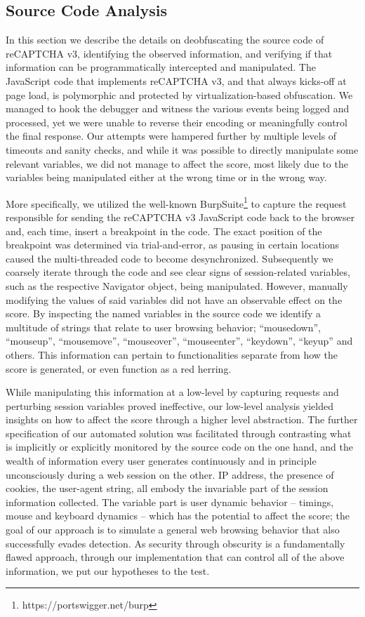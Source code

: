 \subsection{Source Code Analysis}
In this section we describe the details on deobfuscating the source code of reCAPTCHA v3, identifying the observed information, and verifying if that information can be programmatically intercepted and manipulated.
The JavaScript code that implements reCAPTCHA v3, and that always kicks-off at page load, is polymorphic and protected by virtualization-based obfuscation.
We managed to hook the debugger and witness the various events being logged and processed, yet we were unable to reverse their encoding or meaningfully control the final response.
Our attempts were hampered further by multiple levels of timeouts and sanity checks, and while it was possible to directly manipulate some relevant variables, we did not manage to affect the score, most likely due to the variables being manipulated either at the wrong time or in the wrong way. 

More specifically, we utilized the well-known BurpSuite\footnote{https://portswigger.net/burp} to capture the request responsible for sending the reCAPTCHA v3 JavaScript code back to the browser and, each time, insert a breakpoint in the code.
The exact position of the breakpoint was determined via trial-and-error, as pausing in certain locations caused the multi-threaded code to become desynchronized.
Subsequently we coarsely iterate through the code and see clear signs of session-related variables, such as the respective Navigator object, being manipulated.
However, manually modifying the values of said variables did not have an observable effect on the score. 
By inspecting the named variables in the source code we identify a multitude of strings that relate to user browsing behavior; ``mousedown'', ``mouseup'', ``mousemove'', ``mouseover'', ``mouseenter'', ``keydown'', ``keyup'' and others.
This information can pertain to functionalities separate from how the score is generated, or even function as a red herring.

While manipulating this information at a low-level by capturing requests and perturbing session variables proved ineffective, our low-level analysis yielded insights on how to affect the score through a higher level abstraction.
The further specification of our automated solution was facilitated through contrasting what is implicitly or explicitly monitored by the source code on the one hand, and the wealth of information every user generates continuously and in principle unconsciously during a web session on the other.
IP address, the presence of cookies, the user-agent string, all embody the invariable part of the session information collected.
The variable part is user dynamic behavior -- timings, mouse and keyboard dynamics -- which has the potential to affect the score; the goal of our approach is to simulate a general web browsing behavior that also successfully evades detection.
As security through obscurity is a fundamentally flawed approach, through our implementation that can control all of the above information, we put our hypotheses to the test.

